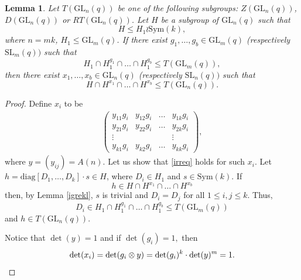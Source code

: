 \documentclass[a4paper,reqno,11pt]{amsart}
\newtheorem{Lem}[Th]{Lemma}
\theoremstyle{definition}
\theoremstyle{remark}
\numberwithin{equation}{section}
\newcommand{\Sym}{\mathrm{Sym}}
\newcommand{\diag}{\mathrm{diag}}
\newcommand{\SL}{{\mathrm{SL}}}
\newcommand{\GL}{{\mathrm{GL}}}
\begin{document}
 

\begin{Lem}\label{prtoirr}
Let $T(\GL_n(q))$ be one of the following subgroups: $Z(\GL_n(q))$, $D(\GL_n(q))$ or $RT(\GL_n(q))$. Let $H$ be a subgroup of $\GL_n(q)$ such that
$$H \le H_1 \wr \Sym(k), $$
where $n=mk$, $H_1 \le \GL_m(q)$. If there exist $g_1, \ldots, g_b \in \GL_m(q)$ ({respectively } $\SL_m(q))$ such that 
$$H_1 \cap H_1^{g_1} \cap \ldots \cap H_1^{g_b} \le T(\GL_m(q)),$$
then there exist   $x_1, \ldots, x_b \in \GL_n(q)$ ({respectively} $\SL_n(q))$ such that 
\begin{equation}\label{irreq}
H \cap H^{x_1} \cap \ldots \cap H^{x_b} \le T(\GL_n(q)).
\end{equation}
\end{Lem}
\begin{proof}
Define $x_i$ to be 
\begin{gather*}
\begin{pmatrix}
y_{11}g_{i}      & y_{1 2}g_{i }      & \ldots     & y_{1 k}g_{i }            \\
y_{21}g_{i}      &  y_{22}g_{i}     & \ldots     & y_{2k}g_{i}             \\
\vdots      &             &            & \vdots               \\
y_{k 1}g_{i }   & y_{k 2}g_{i}   &  \ldots    & y_{kk}g_{i}               
\end{pmatrix},
\end{gather*} 
 where $y=(y_{ij})=A(n).$ Let us show that \eqref{irreq} holds for such $x_i.$  Let  $h=\diag[D_1, \ldots, D_k] \cdot s  \in H$, where $D_i \in H_1$ and $s \in \Sym(k).$
If $$h \in H \cap H^{x_1} \cap \ldots \cap H^{x_b}$$  then, by  Lemma \ref{igrekl}, $s$ is trivial and $D_i=D_j$ for all $1 \le i, j \le {k}$. Thus, $$D_i \in H_1 \cap H_1^{g_1} \cap \ldots \cap H_1^{g_b} \le T(\GL_m(q))$$
and $h \in  T(\GL_n(q)).$ 

Notice that $\det(y)=1$ and if $\det(g_i)=1,$ then 
\begin{equation*}
\det(x_i)=\det(g_i \otimes y)=\det(g_i)^k \cdot \det({y})^m=1. \qedhere
\end{equation*} 
\end{proof}
\end{document}
